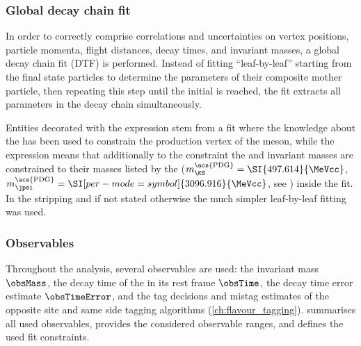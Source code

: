 \subsubsection*{Global decay chain fit}
In order to correctly comprise correlations and uncertainties on vertex
positions, particle momenta, flight distances, decay times, and invariant
masses, a global decay chain fit (\acs{DTF}) \cite{Hulsbergen:2005pu} is
performed. Instead of fitting \enquote{leaf-by-leaf} starting from the final
state particles to determine the parameters of their composite mother particle,
then repeating this step until the initial \bhadron is reached, the \DTF fit
extracts all parameters in the decay chain simultaneously.

Entities decorated with the expression \dtfpv stem from a \DTF fit where the
knowledge about the \PV has been used to constrain the production
vertex of the \Bd meson, while the expression \dtf means that additionally to
the \PV constraint the \jpsi and \KS invariant masses are constrained to their
masses listed by the \PDG ($m_{\KS}^{\text{\acs{PDG}}}=\SI{497.614}{\MeVcc}$,
$m_{\jpsi}^{\text{\acs{PDG}}} = \SI[per-mode=symbol]{3096.916}{\MeVcc}$, see
\cite{Agashe:2014kda}) inside the \DTF fit. In the stripping and if not stated
otherwise the much simpler leaf-by-leaf fitting was used.

\subsubsection*{Observables}

Throughout the analysis, several observables are used: the \Bd invariant mass
$\obsMass$, the decay time of the \Bd in its rest frame $\obsTime$, the \Bd
decay time error estimate $\obsTimeError$, and the tag decisions
\obsTagOSSS and mistag estimates \obsEtaOSSS of the opposite site and same side
tagging algorithms (\cf \cref{ch:flavour_tagging}).
 summarises all
used observables, provides the considered observable ranges, and defines the
used fit constraints.

